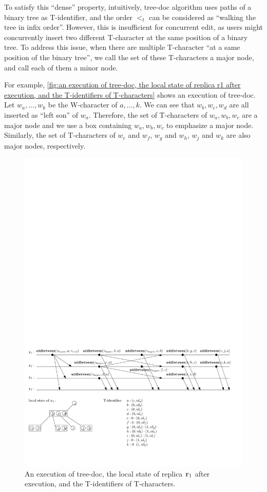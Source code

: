 To satisfy this ``dense'' property, intuitively, tree-doc algorithm uses paths of a binary tree as T-identifier, and the order $<_t$ can be considered as ``walking the tree in infix order''. However, this is insufficient for concurrent edit, as users might concurrently insert two different T-character at the same position of a binary tree. To address this issue, when there are multiple T-character ``at a same position of the binary tree'', we call the set of these T-characters a major node, and call each of them a minor node.

For example, \autoref{fig:an execution of tree-doc, the local state of replica r1 after execution, and the T-identifiers of T-characters} shows an execution of tree-doc. Let $w_a,\ldots,w_k$ be the W-character of $a,\ldots,k$. We can see that $w_b,w_c,w_d$ are all inserted as ``left son'' of $w_a$. Therefore, the set of T-characters of $w_a,w_b,w_c$ are a major node and we use a box containing $w_a,w_b,w_c$ to emphasize a major node. Similarly, the set of T-characters of $w_e$ and $w_f$, $w_g$ and $w_h$, $w_j$ and $w_k$ are also major nodes, respectively.


\begin{figure}[t]
  \centering
  \includegraphics[width=0.8 \textwidth]{figures/TreeDocExecutionandLocalState.pdf}
\vspace{-10pt}
  \caption{An execution of tree-doc, the local state of replica $\mathtt{r}_1$ after execution, and the T-identifiers of T-characters.}
  \label{fig:an execution of tree-doc, the local state of replica r1 after execution, and the T-identifiers of T-characters}
\end{figure}


